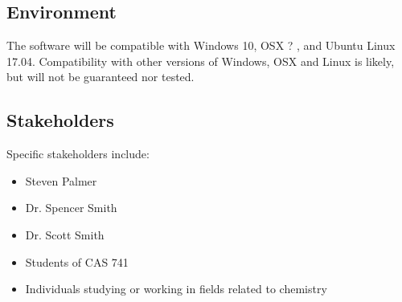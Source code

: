 \documentclass{article}
\begin{document}
\subsection*{Environment}
The software will be compatible with Windows 10, OSX ? , and Ubuntu Linux 17.04.  Compatibility with other versions of Windows, OSX and Linux is likely, but will not be guaranteed nor tested.

\subsection*{Stakeholders}
Specific stakeholders include:
\begin{itemize}
\item Steven Palmer
\item Dr. Spencer Smith
\item Dr. Scott Smith
\item Students of CAS 741 
\item Individuals studying or working in fields related to chemistry
\end{itemize}
\end{document}
